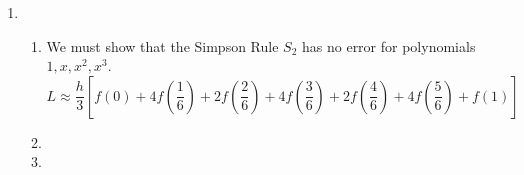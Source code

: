 \documentclass[12pt]{article}
\begin{document}
\begin{enumerate}[leftmargin=2em]
    \item 
    \begin{enumerate}[leftmargin=!]
        \item We must show that the Simpson Rule $S_2$ has no error for polynomials $1, x, x^{2}, x^{3}$.
        \[L \approx \frac{h}{3} \left[ f(0) + 4f\left(\frac{1}{6}\right) + 2f\left(\frac{2}{6}\right) + 4f\left(\frac{3}{6}\right) + 2f\left(\frac{4}{6}\right) + 4f\left(\frac{5}{6}\right) + f(1) \right]\]


        \item

        \item
    \end{enumerate}
\end{enumerate}
\end{document}
